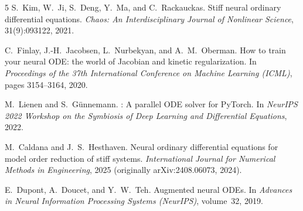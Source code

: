 \documentclass[10pt,a4paper]{article}
\begin{document}
\vspace{-0.4em}
\begin{thebibliography}{5}
\setlength{\itemsep}{-0.5pt}
\setlength{\parskip}{0pt}
\scriptsize
{}
S.~Kim, W.~Ji, S.~Deng, Y.~Ma, and C.~Rackauckas.
\newblock Stiff neural ordinary differential equations.
\newblock \emph{Chaos: An Interdisciplinary Journal of Nonlinear Science}, 31(9):093122, 2021.

C.~Finlay, J.-H.~Jacobsen, L.~Nurbekyan, and A.~M.~Oberman.
\newblock How to train your neural {ODE}: the world of {J}acobian and kinetic regularization.
\newblock In \emph{Proceedings of the 37th International Conference on Machine Learning (ICML)}, pages 3154--3164, 2020.

M.~Lienen and S.~G{\"u}nnemann.
: A parallel {ODE} solver for {PyTorch}.
\newblock In \emph{NeurIPS 2022 Workshop on the Symbiosis of Deep Learning and Differential Equations}, 2022.

M.~Caldana and J.~S.~Hesthaven.
\newblock Neural ordinary differential equations for model order reduction of stiff systems.
\newblock \emph{International Journal for Numerical Methods in Engineering}, 2025 (originally arXiv:2408.06073, 2024).

E.~Dupont, A.~Doucet, and Y.~W.~Teh.
\newblock Augmented neural {ODEs}.
\newblock In \emph{Advances in Neural Information Processing Systems (NeurIPS)}, volume~32, 2019.
\end{thebibliography}
\end{document}
